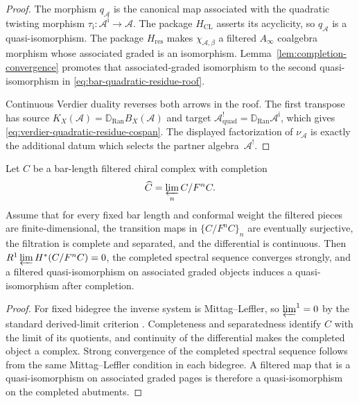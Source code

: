 \begin{proof}
The morphism $q_{\mathcal A}$ is the canonical map associated with the
quadratic twisting morphism
$\tau_{\mathrm i}\colon\mathcal A^{\mathrm i}\to\mathcal A$.
The package $H_{\mathrm{CL}}$ asserts its acyclicity, so
$q_{\mathcal A}$ is a quasi-isomorphism.  The package
$H_{\mathrm{res}}$ makes $\chi_{\mathcal A,\beta}$ a filtered
$A_\infty$ coalgebra morphism whose associated graded is an
isomorphism.  Lemma~\ref{lem:completion-convergence} promotes that
associated-graded isomorphism to the second quasi-isomorphism in
\eqref{eq:bar-quadratic-residue-roof}.

Continuous Verdier duality reverses both arrows in the roof.  The
first transpose has source
$K_X(\mathcal A)=\mathbb D_{\operatorname{Ran}}B_X(\mathcal A)$ and
target
$\mathcal A^!_{\mathrm{quad}}
=\mathbb D_{\operatorname{Ran}}\mathcal A^{\mathrm i}$, which gives
\eqref{eq:verdier-quadratic-residue-cospan}.  The displayed
factorization of $\nu_{\mathcal A}$ is exactly the additional datum
which selects the partner algebra~$\mathcal A^!$.
\end{proof}

\begin{lemma}\label{lem:completion-convergence}
Let $C$ be a bar-length filtered chiral complex with completion
\[
\widehat C=\varprojlim_n C/F^nC.
\]
Assume that for every fixed bar length and conformal weight the
filtered pieces are finite-dimensional, the transition maps in
$\{C/F^nC\}_n$ are eventually surjective, the filtration is complete
and separated, and the differential is continuous. Then
$R^1\varprojlim H^*(C/F^nC)=0$, the completed spectral sequence
converges strongly, and a filtered quasi-isomorphism on associated
graded objects induces a quasi-isomorphism after completion.
\end{lemma}

\begin{proof}
For fixed bidegree the inverse system is Mittag--Leffler, so
$\varprojlim^1=0$ by the standard derived-limit criterion
\cite[Proposition~3.5.7]{Weibel94}. Completeness and separatedness
identify $C$ with the limit of its quotients, and continuity of the
differential makes the completed object a complex. Strong convergence
of the completed spectral sequence follows from the same
Mittag--Leffler condition in each bidegree. A filtered map that is a
quasi-isomorphism on associated graded pages is therefore a
quasi-isomorphism on the completed abutments.
\end{proof}


